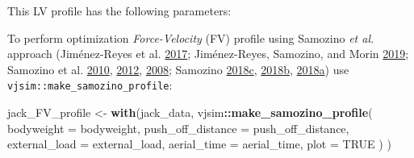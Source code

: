 \documentclass[
]{book}
\newenvironment{Shaded}{\begin{snugshade}}{\end{snugshade}}
\newcommand{\CommentTok}[1]{\textcolor[rgb]{0.56,0.35,0.01}{\textit{#1}}}
\newcommand{\DataTypeTok}[1]{\textcolor[rgb]{0.13,0.29,0.53}{#1}}
\newcommand{\KeywordTok}[1]{\textcolor[rgb]{0.13,0.29,0.53}{\textbf{#1}}}
\newcommand{\NormalTok}[1]{#1}
\newcommand{\OperatorTok}[1]{\textcolor[rgb]{0.81,0.36,0.00}{\textbf{#1}}}
\newcommand{\OtherTok}[1]{\textcolor[rgb]{0.56,0.35,0.01}{#1}}
\newcommand{\StringTok}[1]{\textcolor[rgb]{0.31,0.60,0.02}{#1}}
\begin{document}
This LV profile has the following parameters:

\begin{Shaded}
\end{Shaded}

To perform optimization \emph{Force-Velocity} (FV) profile using Samozino \emph{et al.} approach (Jiménez-Reyes et al. \protect\hyperlink{ref-jimenez-reyesEffectivenessIndividualizedTraining2017}{2017}; Jiménez-Reyes, Samozino, and Morin \protect\hyperlink{ref-jimenez-reyesOptimizedTrainingJumping2019}{2019}; Samozino et al. \protect\hyperlink{ref-samozinoJumpingAbilityTheoretical2010}{2010}, \protect\hyperlink{ref-samozinoOptimalForceVelocity2012}{2012}, \protect\hyperlink{ref-samozinoSimpleMethodMeasuring2008}{2008}; Samozino \protect\hyperlink{ref-samozinoOptimalForceVelocityProfile2018}{2018}\protect\hyperlink{ref-samozinoOptimalForceVelocityProfile2018}{c}, \protect\hyperlink{ref-samozinoSimpleMethodMeasuring2018}{2018}\protect\hyperlink{ref-samozinoSimpleMethodMeasuring2018}{b}, \protect\hyperlink{ref-samozinoSimpleMethodMeasuring2018a}{2018}\protect\hyperlink{ref-samozinoSimpleMethodMeasuring2018a}{a}) use \texttt{vjsim::make\_samozino\_profile}:

\begin{Shaded}
\begin{Highlighting}[]
\NormalTok{jack\_FV\_profile <{-}}\StringTok{ }\KeywordTok{with}\NormalTok{(jack\_data,}
\NormalTok{ vjsim}\OperatorTok{::}\KeywordTok{make\_samozino\_profile}\NormalTok{(}
   \DataTypeTok{bodyweight =}\NormalTok{ bodyweight,}
   \DataTypeTok{push\_off\_distance =}\NormalTok{ push\_off\_distance,}
   \DataTypeTok{external\_load =}\NormalTok{ external\_load,}
   \DataTypeTok{aerial\_time =}\NormalTok{ aerial\_time,}
   \DataTypeTok{plot =} \OtherTok{TRUE}
\NormalTok{ )}
\NormalTok{)}
\end{Highlighting}
\end{Shaded}
\end{document}
